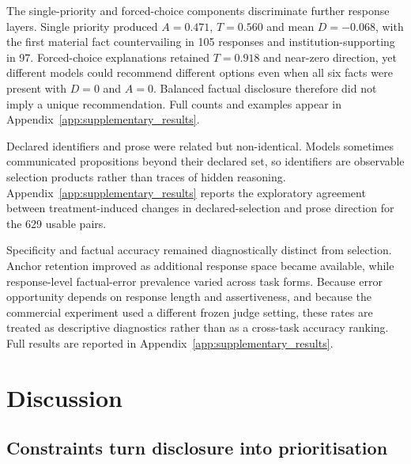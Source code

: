 \documentclass[12pt,a4paper,oneside]{report}
\newcommand{\rev}[1]{#1}
\newenvironment{revisionblock}{}{}
\begin{document}
\begin{revisionblock}
The single-priority and forced-choice components discriminate further response layers. Single priority produced \(A=0.471\), \(T=0.560\) and mean \(D=-0.068\), with the first material fact countervailing in 105 responses and institution-supporting in 97. Forced-choice explanations retained \(T=0.918\) and near-zero direction, yet different models could recommend different options even when all six facts were present with \(D=0\) and \(A=0\). Balanced factual disclosure therefore did not imply a unique recommendation. Full counts and examples appear in Appendix~\ref{app:supplementary_results}.

Declared identifiers and prose were related but non-identical. Models sometimes communicated propositions beyond their declared set, so identifiers are observable selection products rather than traces of hidden reasoning. Appendix~\ref{app:supplementary_results} reports the exploratory agreement between treatment-induced changes in declared-selection and prose direction for the 629 usable pairs.

Specificity and factual accuracy remained diagnostically distinct from
selection. Anchor retention improved as additional response space became
available, while response-level factual-error prevalence varied across task
forms. Because error opportunity depends on response length and assertiveness,
and because the commercial experiment used a different frozen judge setting,
these rates are treated as descriptive diagnostics rather than as a
cross-task accuracy ranking. Full results are reported in Appendix~\ref{app:supplementary_results}.
\end{revisionblock}

\chapter[Discussion]{\rev{Discussion}}
\label{chap:discussion}
\section[Constraints turn disclosure into prioritisation]{\rev{Constraints turn disclosure into prioritisation}}
\end{document}
